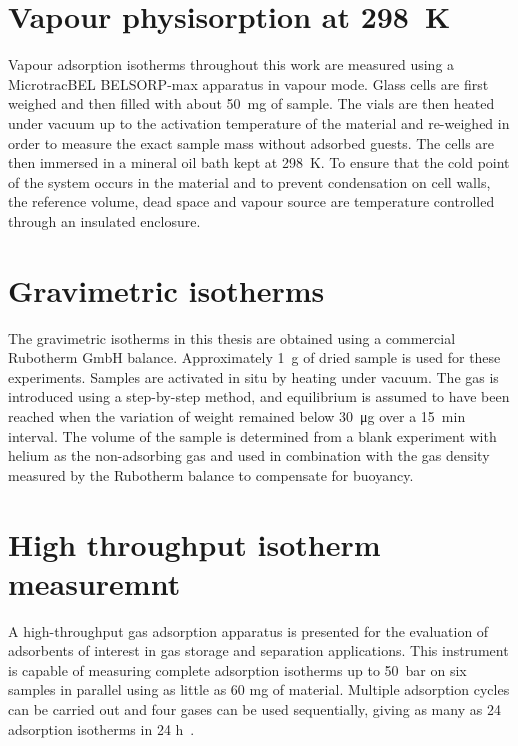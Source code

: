 \section{Vapour physisorption at \SI{298}{\kelvin}}\label{appx:char:vapourphys}

Vapour adsorption isotherms throughout this work are measured
using a MicrotracBEL BELSORP-max apparatus in vapour mode.
Glass cells are first weighed and then filled with about
\SI{50}{\milli\gram} of sample. The vials are then heated
under vacuum up to the activation temperature of the material
and re-weighed in order to measure the exact sample mass
without adsorbed guests. The cells are then immersed in a
mineral oil bath kept at \SI{298}{\kelvin}. To ensure that the 
cold point of the system occurs in the material and to 
prevent condensation on cell walls, the reference volume, dead space 
and vapour source are temperature controlled through an
insulated enclosure.

\section{Gravimetric isotherms}\label{appx:char:gravimetry}

The gravimetric isotherms in this thesis are obtained 
using a commercial Rubotherm GmbH balance. Approximately 
\SI{1}{\gram} of dried sample is used for these experiments. 
Samples are activated in situ by heating under vacuum. 
The gas is introduced using a step-by-step method, and equilibrium is
assumed to have been reached when the variation of weight remained
below \SI{30}{\micro\gram} over a \SI{15}{\minute} interval. 
The volume of the sample is determined from a blank experiment 
with helium as the non-adsorbing
gas and used in combination with the gas density measured by the
Rubotherm balance to compensate for buoyancy.

\section{High throughput isotherm measuremnt}\label{appx:char:highthroughput}

A high-throughput gas adsorption apparatus is presented for the 
evaluation of adsorbents of interest in gas storage and
separation applications. This instrument is capable of measuring 
complete adsorption isotherms up to \SI{50}{\bar} on six samples in 
parallel using as little as 60 mg of material. Multiple adsorption 
cycles can be carried out and four gases can be used sequentially, 
giving as many as 24 adsorption isotherms 
in 24 h~\cite{wiersumExperimentalScreeningPorous2013}.

